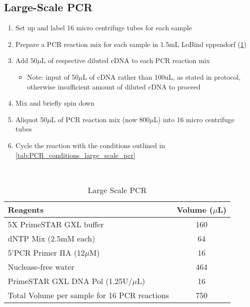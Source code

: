 \subsection{Large-Scale PCR} 
\begin{enumerate}
	\item Set up and label 16 micro centrifuge tubes for each sample 
	\item Prepare a PCR reaction mix for each sample in 1.5mL LoBind eppendorf (\cref{tab:large_scale_pcr})
	\item Add 50$\mu$L of respective diluted cDNA to each PCR reaction mix 
	\begin{itemize}
		\item Note: input of 50$\mu$L of cDNA rather than 100uL, as stated in protocol, otherwise insufficient amount of diluted cDNA to proceed
	\end{itemize}
	\item Mix and briefly spin down
	\item Aliquot 50$\mu$L of PCR reaction mix (now 800$\mu$L) into 16 micro centrifuge tubes
	\item Cycle the reaction with the conditions outlined in \cref{tab:PCR_conditions_large_scale_pcr} 
\end{enumerate}
\
\begin{table}[ht]
	\centering
	\begin{tabularx}{0.8\textwidth}{lc}
		\toprule 
		Reagents                                     & Volume ($\mu$L) \\ \midrule
		5X PrimeSTAR GXL buffer                      & 160         \\
		dNTP Mix (2.5mM each)                        & 64          \\
		5'PCR Primer IIA (12$\mu$M)                      & 16          \\
		Nuclease-free water                          & 464         \\
		PrimeSTAR GXL DNA Pol (1.25U/$\mu$L)             & 16          \\
		Total Volume per sample for 16 PCR reactions & 750 \\
		\bottomrule        
	\end{tabularx}
	\caption{Large Scale PCR}
	\label{tab:large_scale_pcr}
\end{table}

